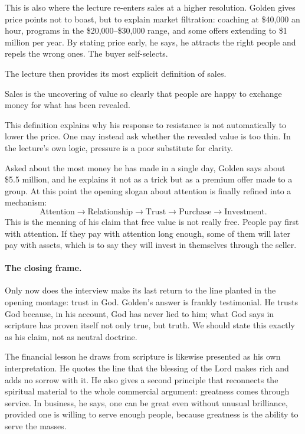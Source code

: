 This is also where the lecture re-enters sales at a higher resolution. Golden gives price points not to boast, but to explain market filtration: coaching at \$40,000 an hour, programs in the \$20,000--\$30,000 range, and some offers extending to \$1 million per year. By stating price early, he says, he attracts the right people and repels the wrong ones. The buyer self-selects.

The lecture then provides its most explicit definition of sales.

\begin{definition}
Sales is the uncovering of value so clearly that people are happy to exchange money for what has been revealed.
\end{definition}

This definition explains why his response to resistance is not automatically to lower the price. One may instead ask whether the revealed value is too thin. In the lecture's own logic, pressure is a poor substitute for clarity.

Asked about the most money he has made in a single day, Golden says about \$5.5 million, and he explains it not as a trick but as a premium offer made to a group. At this point the opening slogan about attention is finally refined into a mechanism:
\begin{equation}
\text{Attention}
\rightarrow
\text{Relationship}
\rightarrow
\text{Trust}
\rightarrow
\text{Purchase}
\rightarrow
\text{Investment}.
\end{equation}
This is the meaning of his claim that free value is not really free. People pay first with attention. If they pay with attention long enough, some of them will later pay with assets, which is to say they will invest in themselves through the seller.

\paragraph{The closing frame.}
Only now does the interview make its last return to the line planted in the opening montage: trust in God. Golden's answer is frankly testimonial. He trusts God because, in his account, God has never lied to him; what God says in scripture has proven itself not only true, but truth. We should state this exactly as his claim, not as neutral doctrine.

The financial lesson he draws from scripture is likewise presented as his own interpretation. He quotes the line that the blessing of the Lord makes rich and adds no sorrow with it. He also gives a second principle that reconnects the spiritual material to the whole commercial argument: greatness comes through service. In business, he says, one can be great even without unusual brilliance, provided one is willing to serve enough people, because greatness is the ability to serve the masses.

